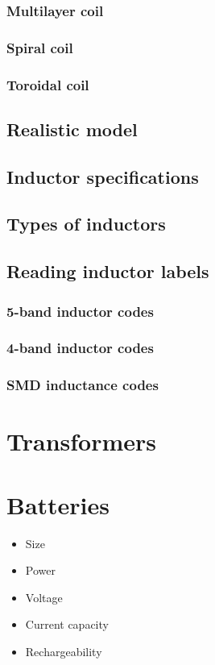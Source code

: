 \documentclass{report}
\begin{document}
\subsubsection{Multilayer coil}
\subsubsection{Spiral coil}
\subsubsection{Toroidal coil}
\subsection{Realistic model}
\subsection{Inductor specifications}
\subsection{Types of inductors}
\subsection{Reading inductor labels}
\subsubsection{5-band inductor codes}
\subsubsection{4-band inductor codes}
\subsubsection{SMD inductance codes}
\section{Transformers}
\section{Batteries}
\begin{itemize}
\item Size
\item Power
\item Voltage
\item Current capacity
\item Rechargeability
\end{itemize}
\end{document}
